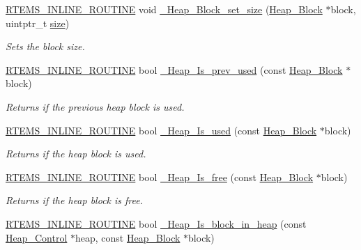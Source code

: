 \begin{DoxyCompactItemize}
\mbox{\hyperlink{group__RTEMSScoreBaseDefs_gac216239df231d5dbd15e3520b0b9313f}{R\+T\+E\+M\+S\+\_\+\+I\+N\+L\+I\+N\+E\+\_\+\+R\+O\+U\+T\+I\+NE}} void \mbox{\hyperlink{group__RTEMSScoreHeap_gaf0c66d5f866002204674e2639575efc3}{\+\_\+\+Heap\+\_\+\+Block\+\_\+set\+\_\+size}} (\mbox{\hyperlink{structHeap__Block}{Heap\+\_\+\+Block}} $\ast$block, uintptr\+\_\+t \mbox{\hyperlink{sun4u_2tte_8h_a245260f6f74972558f61b85227df5aae}{size}})
\begin{DoxyCompactList}\small\item\em Sets the block size. \end{DoxyCompactList}\item 
\mbox{\hyperlink{group__RTEMSScoreBaseDefs_gac216239df231d5dbd15e3520b0b9313f}{R\+T\+E\+M\+S\+\_\+\+I\+N\+L\+I\+N\+E\+\_\+\+R\+O\+U\+T\+I\+NE}} bool \mbox{\hyperlink{group__RTEMSScoreHeap_gad88e4681224e360888f3f4bd020c97a9}{\+\_\+\+Heap\+\_\+\+Is\+\_\+prev\+\_\+used}} (const \mbox{\hyperlink{structHeap__Block}{Heap\+\_\+\+Block}} $\ast$block)
\begin{DoxyCompactList}\small\item\em Returns if the previous heap block is used. \end{DoxyCompactList}\item 
\mbox{\hyperlink{group__RTEMSScoreBaseDefs_gac216239df231d5dbd15e3520b0b9313f}{R\+T\+E\+M\+S\+\_\+\+I\+N\+L\+I\+N\+E\+\_\+\+R\+O\+U\+T\+I\+NE}} bool \mbox{\hyperlink{group__RTEMSScoreHeap_ga7108eed881e09dc3519e8a35220f0feb}{\+\_\+\+Heap\+\_\+\+Is\+\_\+used}} (const \mbox{\hyperlink{structHeap__Block}{Heap\+\_\+\+Block}} $\ast$block)
\begin{DoxyCompactList}\small\item\em Returns if the heap block is used. \end{DoxyCompactList}\item 
\mbox{\hyperlink{group__RTEMSScoreBaseDefs_gac216239df231d5dbd15e3520b0b9313f}{R\+T\+E\+M\+S\+\_\+\+I\+N\+L\+I\+N\+E\+\_\+\+R\+O\+U\+T\+I\+NE}} bool \mbox{\hyperlink{group__RTEMSScoreHeap_gae9a216779de2fa37926f7cba5d8342dd}{\+\_\+\+Heap\+\_\+\+Is\+\_\+free}} (const \mbox{\hyperlink{structHeap__Block}{Heap\+\_\+\+Block}} $\ast$block)
\begin{DoxyCompactList}\small\item\em Returns if the heap block is free. \end{DoxyCompactList}\item 
\mbox{\hyperlink{group__RTEMSScoreBaseDefs_gac216239df231d5dbd15e3520b0b9313f}{R\+T\+E\+M\+S\+\_\+\+I\+N\+L\+I\+N\+E\+\_\+\+R\+O\+U\+T\+I\+NE}} bool \mbox{\hyperlink{group__RTEMSScoreHeap_gabc511a89a627aea2d91fbc21b95a4ae7}{\+\_\+\+Heap\+\_\+\+Is\+\_\+block\+\_\+in\+\_\+heap}} (const \mbox{\hyperlink{structHeap__Control}{Heap\+\_\+\+Control}} $\ast$heap, const \mbox{\hyperlink{structHeap__Block}{Heap\+\_\+\+Block}} $\ast$block)

\end{DoxyCompactItemize}
